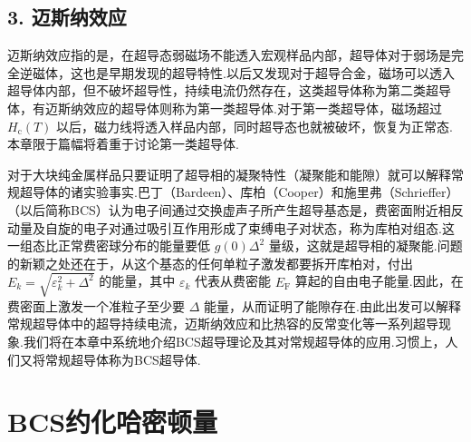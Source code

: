 \subsection*{3. 迈斯纳效应}

迈斯纳效应指的是，在超导态弱磁场不能透入宏观样品内部，超导体对于弱场是完全逆磁体，这也是早期发现的超导特性.以后又发现对于超导合金，磁场可以透入超导体内部，但不破坏超导性，持续电流仍然存在，这类超导体称为第二类超导体，有迈斯纳效应的超导体则称为第一类超导体.对于第一类超导体，磁场超过 $H_{\mathrm{c}}(T)$ 以后，磁力线将透入样品内部，同时超导态也就被破坏，恢复为正常态.本章限于篇幅将着重于讨论第一类超导体.

对于大块纯金属样品只要证明了超导相的凝聚特性（凝聚能和能隙）就可以解释常规超导体的诸实验事实.巴丁（Bardeen）、库柏（Cooper）和施里弗（Schrieffer）（以后简称BCS）认为电子间通过交换虚声子所产生超导基态是，费密面附近相反动量及自旋的电子对通过吸引互作用形成了束缚电子对状态，称为库柏对组态.这一组态比正常费密球分布的能量要低 $g(0)\Delta^{2}$ 量级，这就是超导相的凝聚能.问题的新颖之处还在于，从这个基态的任何单粒子激发都要拆开库柏对，付出 $E_{k}=\sqrt{\varepsilon_{k}^{2}+\Delta^{2}}$ 的能量，其中 $\varepsilon_{k}$ 代表从费密能 $E_{\mathrm{F}}$ 算起的自由电子能量.因此，在费密面上激发一个准粒子至少要 $\Delta$ 能量，从而证明了能隙存在.由此出发可以解释常规超导体中的超导持续电流，迈斯纳效应和比热容的反常变化等一系列超导现象.我们将在本章中系统地介绍BCS超导理论及其对常规超导体的应用.习惯上，人们又将常规超导体称为BCS超导体.

\section{BCS约化哈密顿量}

